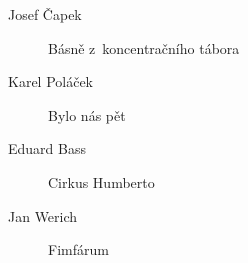 {
\begin{description}
	\item[Josef Čapek] Básně z~koncentračního tábora
	\item[Karel Poláček] Bylo nás pět
	\item[Eduard Bass] Cirkus Humberto
	\item[Jan Werich] Fimfárum
\end{description}
}
